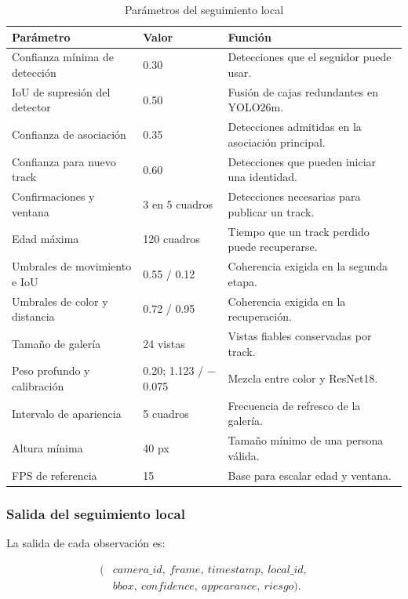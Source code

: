 \documentclass[12pt,letterpaper]{article}
\begin{document}
\begin{table}[H]
\caption{Parámetros del seguimiento local}
\label{tab:tracker_params}
\centering
\footnotesize
\begin{tabular}{p{}p{}p{}}
\hline
\textbf{Parámetro} & \textbf{Valor} & \textbf{Función} \\
\hline
Confianza mínima de detección & 0.30 & Detecciones que el seguidor puede usar. \\
IoU de supresión del detector & 0.50 & Fusión de cajas redundantes en YOLO26m. \\
Confianza de asociación & 0.35 & Detecciones admitidas en la asociación principal. \\
Confianza para nuevo track & 0.60 & Detecciones que pueden iniciar una identidad. \\
Confirmaciones y ventana & 3 en 5 cuadros & Detecciones necesarias para publicar un track. \\
Edad máxima & 120 cuadros & Tiempo que un track perdido puede recuperarse. \\
Umbrales de movimiento e IoU & 0.55 / 0.12 & Coherencia exigida en la segunda etapa. \\
Umbrales de color y distancia & 0.72 / 0.95 & Coherencia exigida en la recuperación. \\
Tamaño de galería & 24 vistas & Vistas fiables conservadas por track. \\
Peso profundo y calibración & 0.20; 1.123 / $-$0.075 & Mezcla entre color y ResNet18. \\
Intervalo de apariencia & 5 cuadros & Frecuencia de refresco de la galería. \\
Altura mínima & 40 px & Tamaño mínimo de una persona válida. \\
FPS de referencia & 15 & Base para escalar edad y ventana. \\
\hline
\end{tabular}
\end{table}

\subsubsection{Salida del seguimiento local}

La salida de cada observación es:

\begin{equation}
\begin{aligned}
(&camera\_id,\ frame,\ timestamp,\ local\_id,\\
&bbox,\ confidence,\ appearance,\ riesgo).
\end{aligned}
\end{equation}
\end{document}
